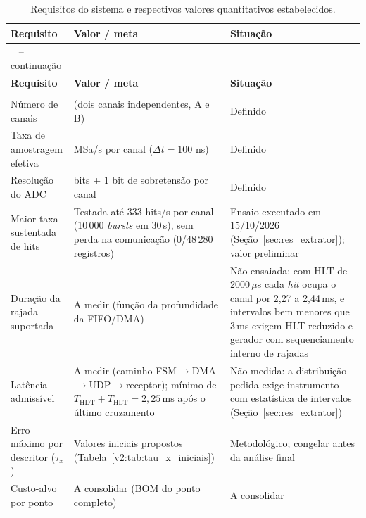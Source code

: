 \begingroup
\footnotesize
\renewcommand{\arraystretch}{1.25}
\begin{longtable}{
		|>{\raggedright\arraybackslash}p{}
		|>{\raggedright\arraybackslash}p{}
		|>{\raggedright\arraybackslash}p{}|}
	\caption{Requisitos do sistema e respectivos valores quantitativos estabelecidos.}
	\label{v2:tab:requisitos_sistema}\\
	\hline
	\textbf{Requisito} & \textbf{Valor / meta} & \textbf{Situação} \\
	\hline
	\endfirsthead
	\multicolumn{3}{c}
	{\tablename\ \thetable{} -- continuação}\\
	\hline
	\textbf{Requisito} & \textbf{Valor / meta} & \textbf{Situação} \\
	\hline
	\endhead
	\hline
	\multicolumn{3}{r}{Continua na próxima página.}\\
	\endfoot
	\hline
	\endlastfoot
	Número de canais & 2 (dois canais independentes, A e B) & Definido \\
	\hline
	Taxa de amostragem efetiva & 10 MSa/s por canal ($\Delta t = 100$ ns) & Definido \\
	\hline
	Resolução do ADC & 12 bits + 1 bit de sobretensão por canal & Definido \\
	\hline
	Maior taxa sustentada de hits & Testada até 333 hits/s por canal (10\,000 \textit{bursts} em 30\,s), sem perda na comunicação (0/48\,280 registros) & Ensaio executado em 15/10/2026 (Seção~\ref{sec:res_extrator}); valor preliminar \\
	\hline
	Duração da rajada suportada & A medir (função da profundidade da FIFO/DMA) & Não ensaiada: com HLT de 2000\,\(\mu\)s cada \textit{hit} ocupa o canal por 2,27 a 2,44\,ms, e intervalos bem menores que 3\,ms exigem HLT reduzido e gerador com sequenciamento interno de rajadas \\
	\hline
	Latência admissível & A medir (caminho FSM$\to$DMA$\to$UDP$\to$receptor); mínimo de \(T_{\mathrm{HDT}} + T_{\mathrm{HLT}} = 2{,}25\,\mathrm{ms}\) após o último cruzamento & Não medida: a distribuição pedida exige instrumento com estatística de intervalos (Seção~\ref{sec:res_extrator}) \\
	\hline
	Erro máximo por descritor ($\tau_x$) & Valores iniciais propostos (Tabela~\ref{v2:tab:tau_x_iniciais}) & Metodológico; congelar antes da análise final \\
	\hline
	Custo-alvo por ponto & A consolidar (BOM do ponto completo) & A consolidar \\
\end{longtable}
\endgroup


